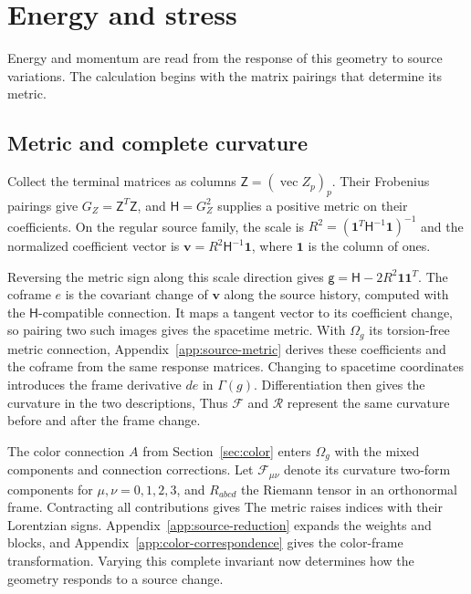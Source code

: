 \section{Energy and stress}
\label{sec:energy}
Energy and momentum are read from the response of this geometry to source variations. The calculation begins with the matrix pairings that determine its metric.

\subsection{Metric and complete curvature}
Collect the terminal matrices as columns $\mathsf Z=(\operatorname{vec}Z_p)_p$. Their Frobenius pairings give $G_Z=\mathsf Z^T\mathsf Z$, and $\mathsf H=G_Z^2$ supplies a positive metric on their coefficients. On the regular source family, the scale is $R^2=(\mathbf1^T\mathsf H^{-1}\mathbf1)^{-1}$ and the normalized coefficient vector is $\mathbf v=R^2\mathsf H^{-1}\mathbf1$, where $\mathbf1$ is the column of ones.

Reversing the metric sign along this scale direction gives $\mathsf g=\mathsf H-2R^2\mathbf1\mathbf1^T$. The coframe $e$ is the covariant change of $\mathbf v$ along the source history, computed with the $\mathsf H$-compatible connection. It maps a tangent vector to its coefficient change, so pairing two such images gives the spacetime metric. With $\Omega_g$ its torsion-free metric connection,
\NativeGeometryDisplay
Appendix~\ref{app:source-metric} derives these coefficients and the coframe from the same response matrices. Changing to spacetime coordinates introduces the frame derivative $de$ in $\Gamma(g)$. Differentiation then gives the curvature in the two descriptions,
\NativeCurvatureDisplay
Thus $\mathscr F$ and $\mathcal R$ represent the same curvature before and after the frame change.

The color connection $A$ from Section~\ref{sec:color} enters $\Omega_g$ with the mixed components and connection corrections. Let $\mathscr F_{\mu\nu}$ denote its curvature two-form components for $\mu,\nu=0,1,2,3$, and $R_{abcd}$ the Riemann tensor in an orthonormal frame. Contracting all contributions gives
\NativeRiemannEnergyDisplay
The metric raises indices with their Lorentzian signs. Appendix~\ref{app:source-reduction} expands the weights and blocks, and Appendix~\ref{app:color-correspondence} gives the color-frame transformation. Varying this complete invariant now determines how the geometry responds to a source change.

